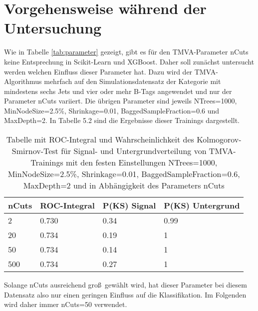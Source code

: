 \section{Vorgehensweise w\"ahrend der Untersuchung}
\label{ch:Vergleich:sec:Vorgehensweise}

Wie in Tabelle \ref{tab:parameter} gezeigt, gibt es f\"ur den TMVA-Parameter nCuts keine Entsprechung in Scikit-Learn und XGBoost. Daher soll zun\"achst untersucht werden welchen Einfluss dieser Parameter hat. Dazu wird der TMVA-Algorithmus mehrfach auf den Simulationsdatensatz der Kategorie mit mindestens sechs Jets und vier oder mehr B-Tags angewendet und nur der Parameter nCuts variiert. Die \"ubrigen Parameter sind jeweils NTrees=1000, MinNodeSize=2.5\%, Shrinkage=0.01, BaggedSampleFraction=0.6 und MaxDepth=2.
In Tabelle 5.2 sind die Ergebnisse dieser Trainings dargestellt.

\begin{table}[tbp]\parbox{12cm}{
  \caption[Variation des TMVA-nCuts-Parameters]{Tabelle mit ROC-Integral und Wahrscheinlichkeit des Kolmogorov-Smirnov-Test f\"ur Signal- und Untergrundverteilung von TMVA-Trainings mit den festen Einstellungen NTrees=1000, MinNodeSize=2.5\%, Shrinkage=0.01, BaggedSampleFraction=0.6, MaxDepth=2 und in Abh\"angigkeit des Parameters nCuts}%
  }
  \label{tab:nCuts}
  \begin{center}
  \begin{tabular}{llll}
  \hline
  nCuts & ROC-Integral & P(KS) Signal & P(KS) Untergrund\\
  \hline
  \num{2} & \num{0,730} & \num{0,34} & \num{0,99}\\
 \num{20} & \num{0,734} & \num{0,19} & \num{1}\\
 \num{50} & \num{0,734} & \num{0,14} & \num{1}\\
\num{500} & \num{0,734} & \num{0,27} & \num{1}\\
  \hline
  \end{tabular}
  \end{center}
\end{table}

Solange nCuts ausreichend gro\ss~gew\"ahlt wird, hat dieser Parameter bei diesem Datensatz also nur einen geringen Einfluss auf die Klassifikation. Im Folgenden wird daher immer nCuts=\num{50} verwendet.

